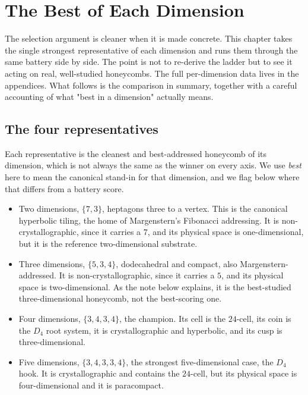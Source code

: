 \section{The Best of Each Dimension}

The selection argument is cleaner when it is made concrete. This chapter takes the single strongest
representative of each dimension and runs them through the same battery side by side. The point is not to
re-derive the ladder but to see it acting on real, well-studied honeycombs. The full per-dimension data lives in
the appendices. What follows is the comparison in summary, together with a careful accounting of what "best in a
dimension" actually means.

\subsection{The four representatives}

Each representative is the cleanest and best-addressed honeycomb of its dimension, which is not always the same as
the winner on every axis. We use \emph{best} here to mean the canonical stand-in for that dimension, and we flag
below where that differs from a battery score.

\begin{itemize}
  \item Two dimensions, $\{7,3\}$, heptagons three to a vertex. This is the canonical hyperbolic tiling, the home
  of Margenstern's Fibonacci addressing. It is non-crystallographic, since it carries a $7$, and its physical
  space is one-dimensional, but it is the reference two-dimensional substrate.
  \item Three dimensions, $\{5,3,4\}$, dodecahedral and compact, also Margenstern-addressed. It is
  non-crystallographic, since it carries a $5$, and its physical space is two-dimensional. As the note below
  explains, it is the best-studied three-dimensional honeycomb, not the best-scoring one.
  \item Four dimensions, $\{3,4,3,4\}$, the champion. Its cell is the $24$-cell, its coin is the $D_4$ root
  system, it is crystallographic and hyperbolic, and its cusp is three-dimensional.
  \item Five dimensions, $\{3,4,3,3,4\}$, the strongest five-dimensional case, the $D_4$ hook. It is
  crystallographic and contains the $24$-cell, but its physical space is four-dimensional and it is paracompact.
\end{itemize}

